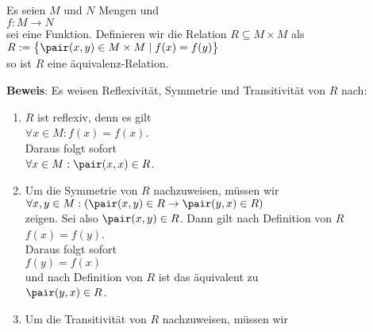 \begin{Satz} Es seien $M$ und $N$ Mengen und 
\\[0.2cm]
\hspace*{1.3cm}
$f : M \rightarrow N$
\\[0.2cm]
sei eine Funktion.  Definieren wir die Relation $R \subseteq M \times M$ als
\\[0.2cm]
\hspace*{1.3cm}
$R := \bigl\{ \pair(x,y) \in M \times M \mid f(x) = f(y) \bigr\}$
\\[0.2cm]
so ist $R$ eine \"{a}quivalenz-Relation.
\end{Satz}

\noindent
\textbf{Beweis}: Es weisen Reflexivit\"{a}t, Symmetrie und Transitivit\"{a}t von $R$ nach:
\begin{enumerate}
\item $R$ ist reflexiv, denn es gilt 
      \\[0.2cm]
      \hspace*{1.3cm}
      $\forall x \in M: f(x) = f(x)$.
      \\[0.2cm]
      Daraus folgt sofort 
      \\[0.2cm]
      \hspace*{1.3cm}
      $\forall x \in M: \pair(x,x) \in R$.
\item Um die Symmetrie von $R$ nachzuweisen, m\"{u}ssen wir
      \\[0.2cm]
      \hspace*{1.3cm}
      $\forall x,y \in M: (\pair(x,y) \in R \rightarrow \pair(y,x) \in R)$
      \\[0.2cm]
      zeigen.  Sei also $\pair(x,y) \in R$. Dann gilt nach Definition von $R$
      \\[0.2cm]
      \hspace*{1.3cm}
      $f(x) = f(y)$.
      \\[0.2cm]
      Daraus folgt sofort 
      \\[0.2cm]
      \hspace*{1.3cm}
      $f(y) = f(x)$
      \\[0.2cm]
      und nach Definition von $R$ ist das \"{a}quivalent zu 
      \\[0.2cm]
      \hspace*{1.3cm}
      $\pair(y,x) \in R$.
\item Um die Transitivit\"{a}t von $R$ nachzuweisen, m\"{u}ssen wir 
      \\[0.2cm]
      \hspace*{1.3cm}

\end{enumerate}
